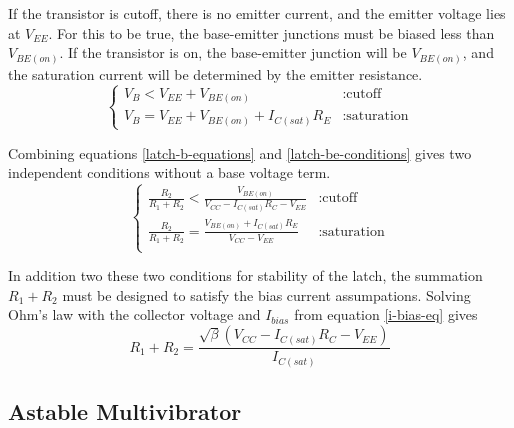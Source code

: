 \documentclass[titlepage, letterpaper, 10.5pt]{article}
\begin{document}
If the transistor is cutoff, there is no emitter current, and the emitter voltage lies at $V_{EE}$.
For this to be true, the base-emitter junctions must be biased less than $V_{BE(on)}$.
If the transistor is on, the base-emitter junction will be $V_{BE(on)}$, and the saturation
current will be determined by the emitter resistance.
\begin{equation}
\left\{
	\begin{array}{lr}
	V_{B}<V_{EE}+V_{BE(on)}	& : \textrm{cutoff}	\\
	V_{B}=V_{EE}+V_{BE(on)}+I_{C(sat)}R_{E}	& : \textrm{saturation}
	\end{array}
\right.
\label{latch-be-conditions}
\end{equation}

Combining equations \ref{latch-b-equations} and \ref{latch-be-conditions} gives two independent
conditions without a base voltage term.
\begin{equation}
\left\{
	\begin{array}{lr}
	\frac{R_{2}}{R_{1}+R_{2}}<\frac{V_{BE(on)}}{V_{CC}-I_{C(sat)}R_{C}-V_{EE}}	& : \textrm{cutoff}	\\
	\frac{R_{2}}{R_{1}+R_{2}}=\frac{V_{BE(on)}+I_{C(sat)}R_{E}}{V_{CC}-V_{EE}}	& : \textrm{saturation}	\\
	\end{array}
\right.
\end{equation}

In addition two these two conditions for stability of the latch,
the summation $R_{1}+R_{2}$ must be designed to satisfy the bias current assumpations.
Solving Ohm's law with the collector voltage and $I_{bias}$ from equation \ref{i-bias-eq} gives
\begin{equation}
R_{1}+R_{2}=\frac{\sqrt{\beta}(V_{CC}-I_{C(sat)}R_{C}-V_{EE})}{I_{C(sat)}}
\end{equation}

\subsection{Astable Multivibrator}
\end{document}
